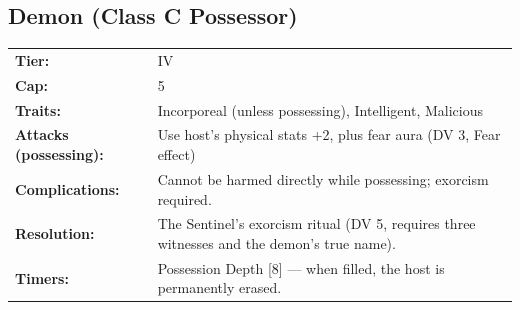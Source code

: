 \subsection{Demon (Class C Possessor)}
\begin{tabular}{@{}ll}
\textbf{Tier:} & IV \\
\textbf{Cap:} & 5 \\
\textbf{Traits:} & Incorporeal (unless possessing), Intelligent, Malicious \\
\textbf{Attacks (possessing):} & Use host's physical stats +2, plus fear aura (DV 3, Fear effect) \\
\textbf{Complications:} & Cannot be harmed directly while possessing; exorcism required. \\
\textbf{Resolution:} & The Sentinel's exorcism ritual (DV 5, requires three witnesses and the demon's true name). \\
\textbf{Timers:} & Possession Depth [8] --- when filled, the host is permanently erased. \\
\end{tabular}

